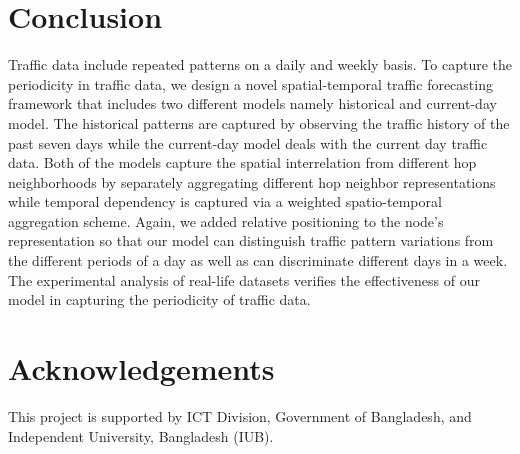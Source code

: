 \documentclass[runningheads]{llncs}
\begin{document}
\section{Conclusion}
Traffic data include repeated patterns on a daily and weekly basis. To capture the periodicity in traffic data, we design a novel spatial-temporal traffic forecasting framework that includes two different models namely historical and current-day model. The historical patterns are captured by observing the traffic history of the past seven days while the current-day model deals with the current day traffic data. Both of the models capture the spatial interrelation from different hop neighborhoods by separately aggregating different hop neighbor representations while temporal dependency is captured via a weighted spatio-temporal aggregation scheme. Again, we added relative positioning to the node's representation so that our model can distinguish traffic pattern variations from the different periods of a day as well as can discriminate different days in a week. The experimental analysis of real-life datasets verifies the effectiveness of our model in capturing the periodicity of traffic data. 

\section{Acknowledgements}
This project is supported by ICT Division, Government of Bangladesh, and Independent University, Bangladesh (IUB).



\end{document}
